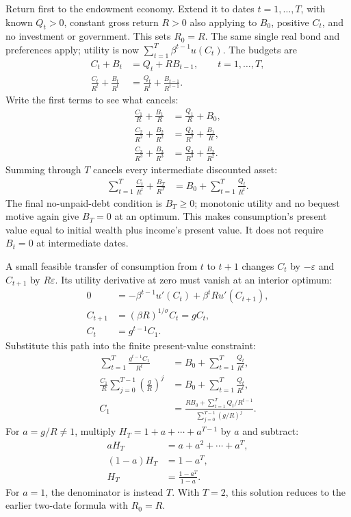 Return first to the endowment economy. Extend it to dates $t=1,\ldots,T$,
with known $Q_t>0$, constant gross return $R>0$ also applying to $B_0$,
positive $C_t$, and no investment or government. This sets $R_0=R$.
The same single real bond and preferences apply; utility is now
$\sum_{t=1}^T\beta^{t-1}u(C_t)$. The budgets are
\begin{align}
 C_t+B_t&=Q_t+RB_{t-1},\qquad t=1,\ldots,T,\\
 \frac{C_t}{R^t}+\frac{B_t}{R^t}
 &=\frac{Q_t}{R^t}+\frac{B_{t-1}}{R^{t-1}}.
\end{align}
Write the first terms to see what cancels:
\begin{align}
 \frac{C_1}{R}+\frac{B_1}{R}&=\frac{Q_1}{R}+B_0,\\
 \frac{C_2}{R^2}+\frac{B_2}{R^2}&=\frac{Q_2}{R^2}+\frac{B_1}{R},\\
 \frac{C_3}{R^3}+\frac{B_3}{R^3}&=\frac{Q_3}{R^3}+\frac{B_2}{R^2}.
\end{align}
Summing through $T$ cancels every intermediate discounted asset:
\begin{align}
 \sum_{t=1}^T\frac{C_t}{R^t}+\frac{B_T}{R^T}
 &=B_0+\sum_{t=1}^T\frac{Q_t}{R^t}.\label{eq:open-finite-telescope}
\end{align}
The final no-unpaid-debt condition is $B_T\geq0$; monotonic utility and no
bequest motive again give $B_T=0$ at an optimum. This makes consumption's
present value equal to initial wealth plus income's present value. It does
not require $B_t=0$ at intermediate dates.

A small feasible transfer of consumption from $t$ to $t+1$ changes
$C_t$ by $-\varepsilon$ and $C_{t+1}$ by $R\varepsilon$. Its utility
derivative at zero must vanish at an interior optimum:
\begin{align}
 0&=-\beta^{t-1}u'(C_t)+\beta^tR u'(C_{t+1}),\\
 C_{t+1}&=(\beta R)^{1/\sigma}C_t=gC_t,\\
 C_t&=g^{t-1}C_1.
\end{align}
Substitute this path into the finite present-value constraint:
\begin{align}
 \sum_{t=1}^T\frac{g^{t-1}C_1}{R^t}
 &=B_0+\sum_{t=1}^T\frac{Q_t}{R^t},\\
 \frac{C_1}{R}\sum_{j=0}^{T-1}\left(\frac gR\right)^j
 &=B_0+\sum_{t=1}^T\frac{Q_t}{R^t},\\
 C_1&=\frac{RB_0+\sum_{t=1}^T Q_t/R^{t-1}}
 {\sum_{j=0}^{T-1}(g/R)^j}.\label{eq:open-finite-choice}
\end{align}
For $a=g/R\ne1$, multiply $H_T=1+a+\cdots+a^{T-1}$ by $a$ and subtract:
\begin{align}
 aH_T&=a+a^2+\cdots+a^T,\\
 (1-a)H_T&=1-a^T,\\
 H_T&=\frac{1-a^T}{1-a}.
\end{align}
For $a=1$, the denominator is instead $T$. With $T=2$, this solution
reduces to the earlier two-date formula with $R_0=R$.

